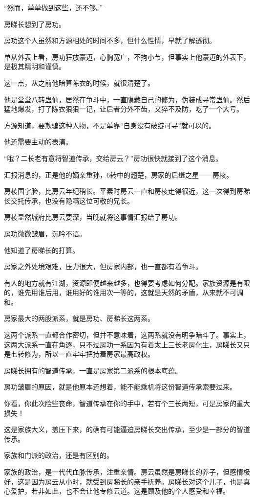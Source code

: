 \begin{this_body}
“然而，单单做到这些，还不够。”

房睇长想到了房功。

房功这个人虽然和方源相处的时间不多，但什么性情，早就了解透彻。

单从外表上看，房功狂放豪迈，心胸宽广，不拘小节，但事实上他豪迈的外表下，是极其精明和谨慎。

这一点，从之前他暗算陈衣的时候，就很清楚了。

他是堂堂八转蛊仙，居然在争斗中，一直隐藏自己的修为，伪装成寻常蛊仙。然后猛地爆发，打了陈衣狠狠一记，让后者分外不齿，又猝不及防，吃了一个大亏。

方源知道，要欺骗这种人物，不是单靠“自身没有破绽可寻”就可以的。

他还需要主动的表演。

“哦？二长老有意将智道传承，交给房云？”房功很快就接到了这个消息。

汇报消息的，正是他的嫡亲重孙，6转中的翘楚，房家的后继之星——房棱。

房棱国字脸，比房云年纪稍长。平素时房云一直和房棱走得很近，这一次得到房睇长交托传承，也没有隐瞒这位可敬的兄长。

房棱显然城府比房云要深，当晚就将这事情汇报给了房功。

房功微微皱眉，沉吟不语。

他知道了房睇长的打算。

房家之外处境艰难，压力很大，但房家内部，也一直都有着争斗。

有人的地方就有江湖，资源即便越来越多，也得要考虑如何分配。家族资源是有限的，谁先用谁后用，谁用好的谁用次一等的，这就是天然的矛盾，从来就不可调和。

房家最大的两股派系，就是房功、房睇长这两系。

这两个派系一直都合作密切，但并不意味着，这两系就没有明争暗斗了。事实上，这两大派系一直在角逐，只不过房功一系因为有着太上三长老房化生，房睇长又只是七转修为，所以一直牢牢把持着房家最高政权。

房睇长拥有的智道传承，一直是房家第二派系的根本底蕴。

房功皱眉的原因，就是他原本还想着，能不能乘机将这份智道传承索要过来。

你看，你此次险些丧命，智道传承在你的手中，若有个三长两短，可是房家的重大损失！

这是家族大义，盖压下来，的确有可能逼迫房睇长交出传承，至少是一部分的智道传承。

家族和门派的政治，还是有区别的。

家族的政治，是一代代血脉传承，注重亲情。房云虽然是房睇长的养子，但感情极好，这是因为房云从小时，就受到房睇长的亲手抚养。房睇长对这个儿子，也是真心爱护，若非如此，也不会让他专修云道。这是顾及他的个人感受和幸福。


\end{this_body}
